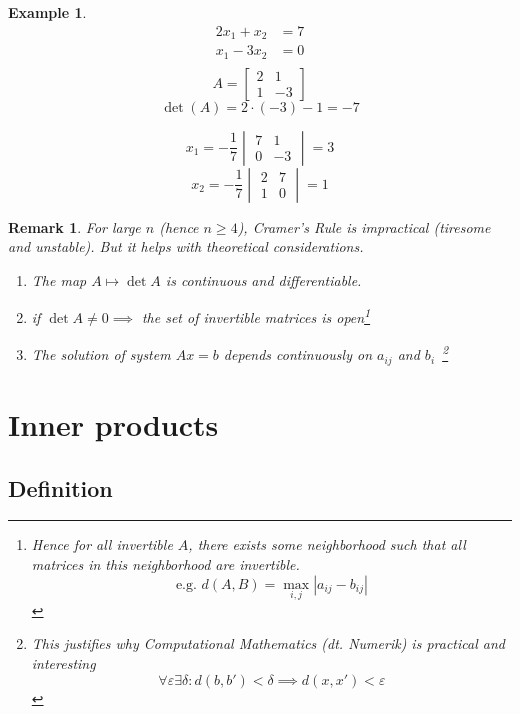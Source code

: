 \documentclass[a4paper]{article}
\numberwithin{lecref}{section}
\newtheorem*{Example}{Example}
\newtheorem*{Remark}{Remark}
\newcommand{\card}[1]{\left|#1\right|}
\begin{document}
\begin{Example}
  \begin{align*}
    2x_1 + x_2 &= 7 \\
    x_1 - 3x_2 &= 0 \\
  \end{align*}%
%
  \[ A = \begin{bmatrix} 2 & 1 \\ 1 & -3 \end{bmatrix} \]
  \[ \det(A) = 2 \cdot (-3) - 1 = -7 \]

  \[ x_1 = -\frac17 \begin{vmatrix} 7 & 1 \\ 0 & -3 \end{vmatrix} = 3 \]
  \[ x_2 = -\frac17 \begin{vmatrix} 2 & 7 \\ 1 & 0 \end{vmatrix} = 1 \]
\end{Example}

\begin{Remark}
  For large $n$ (hence $n \geq 4$), Cramer's Rule is impractical (tiresome and unstable).
  But it helps with theoretical considerations.
  \begin{enumerate}
    \item The map $A \mapsto \det{A}$ is continuous and differentiable.
    \item if $\det{A} \neq 0 \implies$ the set of invertible matrices is open\footnote{Hence for all invertible $A$, there exists some neighborhood such that all matrices in this neighborhood are invertible. \[ \text{e.g. } d(A, B) = \max_{i,j} \card{a_{ij} - b_{ij}} \]}
    \item The solution of system $Ax = b$ depends continuously on $a_{ij}$ and $b_i$~\footnote{
      This justifies why Computational Mathematics (dt. \foreignlanguage{german}{Numerik}) is practical and interesting
      \[ \forall \varepsilon \exists \delta: d(b, b') < \delta \implies d(x, x') < \varepsilon \]
    }
  \end{enumerate}
\end{Remark}

\section{Inner products}

\subsection{Definition}
\end{document}
